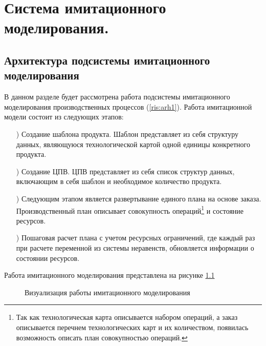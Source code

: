 \chapter{Система имитационного моделирования.}

\section{Архитектура подсистемы имитационного моделирования}

В данном разделе будет рассмотрена работа подсистемы имитационного моделирования производственных процессов (\ref{ris:arh1}). 
Работа имитационной модели состоит из следующих этапов:

\begin{enumerate}
    \item[\mylabel{itm:point1}{1})] Создание шаблона продукта. Шаблон представляет из себя структуру данных, являющуюся технологической картой одной единицы конкретного продукта. 
	\item[\mylabel{itm:point2}{2})] Создание ЦПВ. ЦПВ представляет из себя список структур данных, включающим в себя шаблон и необходимое количество продукта.
	\item[\mylabel{itm:point3}{3})] Следующим этапом является развертывание единого плана на основе заказа. Производственный план описывает совокупность операций\footnote{Так как технологическая карта описывается набором операций, а заказ описывается перечнем технологических карт и их количеством, появилась возможность описать план совокупностью операций.} и состояние ресурсов.
    \item[\mylabel{itm:point4}{4})] Пошаговая расчет плана с учетом ресурсных ограничений, где каждый раз при расчете переменной из системы неравенств, обновляется информации о состоянии ресурсов.
\end{enumerate}

Работа имитационного моделирования представлена на рисунке \ref{ris:alg}
\begin{figure}[H]
    \caption{Визуализация работы имитационного моделирования}
    \label{ris:alg}
\end{figure}

